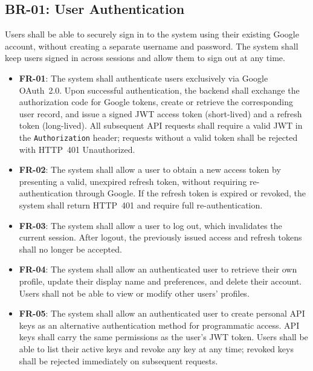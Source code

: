 \documentclass[a4paper]{article}
\begin{document}
\subsection{BR-01: User Authentication}

Users shall be able to securely sign in to the system using their
existing Google account, without creating a separate username and
password. The system shall keep users signed in across sessions
and allow them to sign out at any time.

\begin{itemize}
    \item \textbf{FR-01}: The system shall authenticate users
    exclusively via Google OAuth~2.0. Upon successful authentication,
    the backend shall exchange the authorization code for Google
    tokens, create or retrieve the corresponding user record, and
    issue a signed JWT access token (short-lived) and a refresh
    token (long-lived). All subsequent API requests shall require
    a valid JWT in the \texttt{Authorization} header; requests
    without a valid token shall be rejected with HTTP~401
    Unauthorized.

    \item \textbf{FR-02}: The system shall allow a user to obtain
    a new access token by presenting a valid, unexpired refresh
    token, without requiring re-authentication through Google. If
    the refresh token is expired or revoked, the system shall
    return HTTP~401 and require full re-authentication.

    \item \textbf{FR-03}: The system shall allow a user to log out,
    which invalidates the current session. After logout, the
    previously issued access and refresh tokens shall no longer be
    accepted.

    \item \textbf{FR-04}: The system shall allow an authenticated
    user to retrieve their own profile, update their display name
    and preferences, and delete their account. Users shall not be
    able to view or modify other users' profiles.

    \item \textbf{FR-05}: The system shall allow an authenticated
    user to create personal API keys as an alternative
    authentication method for programmatic access. API keys shall
    carry the same permissions as the user's JWT token. Users shall
    be able to list their active keys and revoke any key at any
    time; revoked keys shall be rejected immediately on subsequent
    requests.
\end{itemize}
\end{document}
